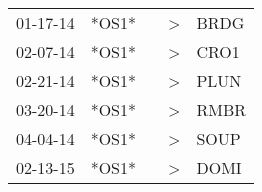 \begin{supertabular}{p{0.07\textwidth}p{0.06\textwidth}p{0.02\textwidth}p{0.02\textwidth}p{0.06\textwidth}}
 01-17-14\textsuperscript{} &  *OS1* &   &  \textgreater &  BRDG\textsuperscript{} \\
 02-07-14\textsuperscript{} &  *OS1* &   &  \textgreater &  CRO1\textsuperscript{} \\
 02-21-14\textsuperscript{} &  *OS1* &   &  \textgreater &  PLUN\textsuperscript{} \\
 03-20-14\textsuperscript{} &  *OS1* &   &  \textgreater &  RMBR\textsuperscript{} \\
 04-04-14\textsuperscript{} &  *OS1* &   &  \textgreater &  SOUP\textsuperscript{} \\
 02-13-15\textsuperscript{} &  *OS1* &   &  \textgreater &  DOMI\textsuperscript{} \\
\end{supertabular}
